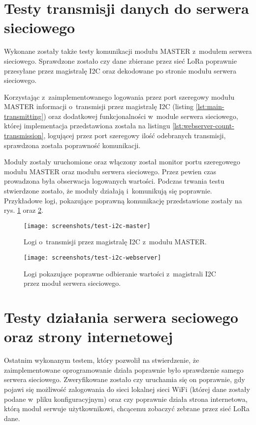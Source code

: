 \FloatBarrier
\section{\label{sect:test-webserver-comm}Testy transmisji danych do serwera sieciowego} Wykonane zostały także testy
komunikacji modułu MASTER z~modułem serwera sieciowego. Sprawdzone zostało czy dane zbierane przez sieć LoRa poprawnie
przesyłane przez magistralę I2C oraz dekodowane po stronie modułu serwera sieciowego.

Korzystając z~zaimplementowanego logowania przez port szeregowy modułu MASTER informacji o~transmisji przez magistralę
I2C (listing \ref{lst:main-transmitting}) oraz dodatkowej funkcjonalności w~module serwera sieciowego, której
implementacja przedstawiona została na listingu \ref{lst:webserver-count-transmission}, logującej przez port szeregowy
ilość odebranych transmisji, sprawdzona została poprawność komunikacji.



Moduły zostały uruchomione oraz włączony został monitor portu szeregowego modułu MASTER oraz modułu serwera sieciowego.
Przez pewien czas prowadzona była obserwacja logowanych wartości. Podczas trwania testu stwierdzone zostało, że moduły
działają i~komunikują się poprawnie. Przykładowe logi, pokazujące poprawną komunikację przedstawione zostały na rys.
\ref{img:test-i2c-master} oraz \ref{img:test-i2c-webserver}.

\begin{figure}[!htbp]
    \centering
    \texttt{[image: screenshots/test-i2c-master]}
    \caption{\label{img:test-i2c-master}Logi o~transmisji przez magistralę I2C z~modułu MASTER.}
\end{figure}

\begin{figure}[!htbp]
    \centering
    \texttt{[image: screenshots/test-i2c-webserver]}
    \caption{\label{img:test-i2c-webserver}Logi pokazujące poprawne odbieranie wartości z~magistrali I2C przez moduł
        serwera sieciowego.}
\end{figure}

\FloatBarrier
\section{\label{sect:test-webserver-website}Testy działania serwera seciowego oraz strony internetowej} Ostatnim
wykonanym testem, który pozwolił na stwierdzenie, że zaimplementowane oprogramowanie działa poprawnie było sprawdzenie
samego serwera sieciowego. Zweryfikowane zostało czy uruchamia się on poprawnie, gdy pojawi się możliwość zalogowania do
sieci lokalnej sieci WiFi (której dane zostały podane w~pliku konfiguracyjnym) oraz czy poprawnie działa strona
internetowa, którą moduł serwuje użytkownikowi, chcącemu zobaczyć zebrane przez sieć LoRa dane.

